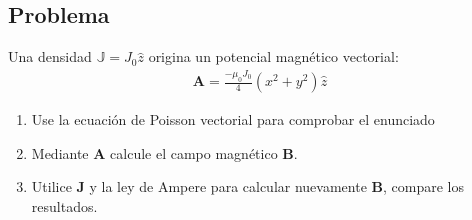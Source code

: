\subsection{Problema} %
\begin{problema}
    Una densidad $\mathbb{J} = J_{0} \hat{{z}}$ origina un potencial magnético vectorial:
\begin{align}
    \textbf{A}= \frac{-\mu_{0}J_{0}}{4}(x^{2}+y^{2})\hat{z}
\end{align}
\begin{enumerate}
    \item Use la ecuación de Poisson vectorial para comprobar el enunciado 
    \item Mediante \textbf{A} calcule el campo magnético \textbf{B}.
    \item Utilice \textbf{J} y la ley de Ampere para calcular nuevamente \textbf{B}, compare los resultados.
\end{enumerate}
\begin{center}
\end{center}
\end{problema}
